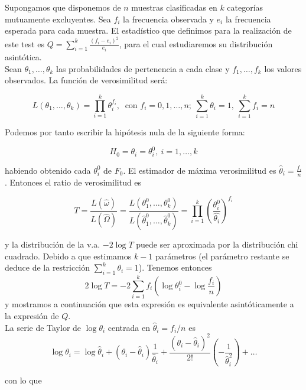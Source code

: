 	Supongamos que disponemos de $n$ muestras clasificadas en $k$ categorías mutuamente excluyentes. Sea $f_i$ la frecuencia observada y $e_i$ la frecuencia esperada para cada muestra. El estadístico que definimos para la realización de este test es $Q = \sum\limits_{i=1}^k \frac{(f_i-e_i)^2}{e_i}$, para el cual estudiaremos su distribución asintótica.\\
	
	Sean $\theta_1, \dots, \theta_k$ las probabilidades de pertenencia a cada clase y $f_1, \dots, f_k$ los valores observados. La función de verosimilitud será:
	
	\[ L(\theta_1, \dots, \theta_k) = 
			\prod\limits_{i=1}^k \theta_i^{f_i},\			
	   \text{ con } f_i = 0, 1, \dots, n; \
	   \sum\limits_{i=1}^k \theta_i = 1, \
	   \sum\limits_{i=1}^k f_i = n
	 \]
	 
	 Podemos por tanto escribir la hipótesis nula de la siguiente forma:
	 
	 \[ H_0 = \theta_i = \theta_i^0,\ i = 1, \dots, k \]
	 
	 habiendo obtenido cada $\theta_i^0$ de $F_0$. El estimador de máxima verosimilitud es $\hat{\theta}_i = \frac{f_i}{n}$. Entonces el ratio de verosimilitud es
	 
	 \[ 
	 T = \frac{L(\hat{\omega})}{L(\hat{\Omega})}
	   = \frac{L(\theta_1^0, \dots, \theta_k^0)}
	   		{L(\hat{\theta}_1^0, \dots, \hat{\theta}_k^0)}
	   = \prod\limits_{i=1}^k
	   		\left( 
	 			\frac{\theta_i^0}{\hat{\theta_i}} 
	 		\right)^{f_i}
	 \]
	 
	 y la distribución de la v.a. $-2 \log T$ puede ser aproximada por la distribución chi cuadrado. Debido a que estimamos $k-1$ parámetros (el parámetro restante se deduce de la restricción $\sum\limits_{i=1}^k \theta_i = 1$). Tenemos entonces
	 \begin{equation}
	 2 \log T = 
	 		-2 \sum\limits_{i=1}^k
	 			f_i \left(
	 					\log \theta_i^0 - \log \frac{f_i}{n}
	 				\right)
	 \label{2logT}
	 \end{equation}
	y mostramos a continuación que esta expresión es equivalente asintóticamente a la expresión de $Q$.\\
	
	La serie de Taylor de $\log \theta_i$ centrada en $\hat{\theta}_i = f_i/n$ es
	\[ \log \theta_i = 
			\log \hat{\theta}_i +
			(\theta_i - \hat{\theta}_i)
				\frac{1}{\hat{\theta}_i} +
			\frac{(\theta_i - \hat{\theta}_i)^2}{2!}
				\left(-\frac{1}{\hat{\theta}_i^2}\right) +
			\dots
	\]
	
	con lo que
	
